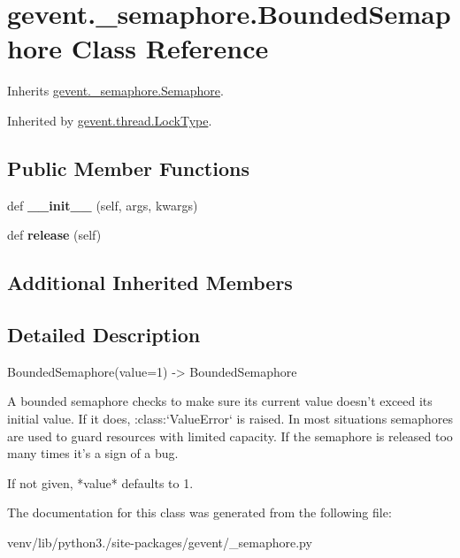 \hypertarget{classgevent_1_1__semaphore_1_1_bounded_semaphore}{}\section{gevent.\+\_\+semaphore.\+Bounded\+Semaphore Class Reference}
\label{classgevent_1_1__semaphore_1_1_bounded_semaphore}


Inherits \hyperlink{classgevent_1_1__semaphore_1_1_semaphore}{gevent.\+\_\+semaphore.\+Semaphore}.



Inherited by \hyperlink{classgevent_1_1thread_1_1_lock_type}{gevent.\+thread.\+Lock\+Type}.

\subsection*{Public Member Functions}
\begin{DoxyCompactItemize}
\item 
\mbox{\label{classgevent_1_1__semaphore_1_1_bounded_semaphore_a88005e20b7a23b4fe55bfbe4e1254304}} 
def {\bfseries \+\_\+\+\_\+init\+\_\+\+\_\+} (self, args, kwargs)
\item 
\mbox{\label{classgevent_1_1__semaphore_1_1_bounded_semaphore_a44a580da7a69128de464148610bd7b2c}} 
def {\bfseries release} (self)
\end{DoxyCompactItemize}
\subsection*{Additional Inherited Members}


\subsection{Detailed Description}
\begin{DoxyVerb}BoundedSemaphore(value=1) -> BoundedSemaphore

A bounded semaphore checks to make sure its current value doesn't
exceed its initial value. If it does, :class:`ValueError` is
raised. In most situations semaphores are used to guard resources
with limited capacity. If the semaphore is released too many times
it's a sign of a bug.

If not given, *value* defaults to 1.
\end{DoxyVerb}
 

The documentation for this class was generated from the following file\+:\begin{DoxyCompactItemize}
\item 
venv/lib/python3./site-\/packages/gevent/\+\_\+semaphore.\+py\end{DoxyCompactItemize}
